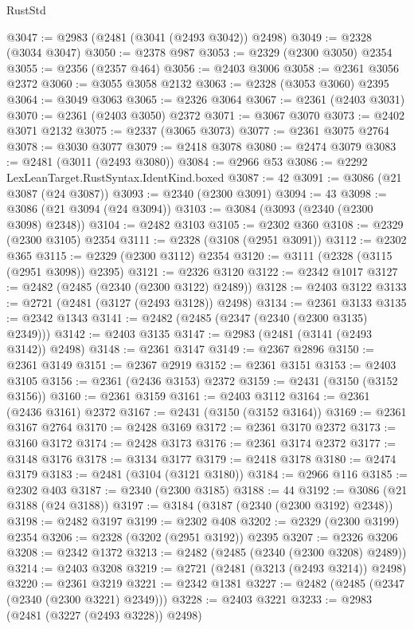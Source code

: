 \begin{lexlean}{RustStd}
\begin{coremodule}
{\begin{coremodule}
{{{{{{{{{{{{{{{{{{{{{{{{{{{{{{{{{{{{{@3047 := @2983 (@2481 (@3041 (@2493 @3042)) @2498)
@3049 := @2328 (@3034 @3047)
@3050 := @2378 @987
@3053 := @2329 (@2300 @3050) @2354
@3055 := @2356 (@2357 @464)
@3056 := @2403 @3006
@3058 := @2361 @3056 @2372
@3060 := @3055 @3058 @2132
@3063 := @2328 (@3053 @3060) @2395
@3064 := @3049 @3063
@3065 := @2326 @3064
@3067 := @2361 (@2403 @3031)
@3070 := @2361 (@2403 @3050) @2372
@3071 := @3067 @3070
@3073 := @2402 @3071 @2132
@3075 := @2337 (@3065 @3073)
@3077 := @2361 @3075 @2764
@3078 := @3030 @3077
@3079 := @2418 @3078
@3080 := @2474 @3079
@3083 := @2481 (@3011 (@2493 @3080))
@3084 := @2966 @53
@3086 := @2292 LexLeanTarget.RustSyntax.IdentKind.boxed
@3087 := 42
@3091 := @3086 (@21 @3087 (@24 @3087))
@3093 := @2340 (@2300 @3091)
@3094 := 43
@3098 := @3086 (@21 @3094 (@24 @3094))
@3103 := @3084 (@3093 (@2340 (@2300 @3098) @2348))
@3104 := @2482 @3103
@3105 := @2302 @360
@3108 := @2329 (@2300 @3105) @2354
@3111 := @2328 (@3108 (@2951 @3091))
@3112 := @2302 @365
@3115 := @2329 (@2300 @3112) @2354
@3120 := @3111 (@2328 (@3115 (@2951 @3098)) @2395)
@3121 := @2326 @3120
@3122 := @2342 @1017
@3127 := @2482 (@2485 (@2340 (@2300 @3122) @2489))
@3128 := @2403 @3122
@3133 := @2721 (@2481 (@3127 (@2493 @3128)) @2498)
@3134 := @2361 @3133
@3135 := @2342 @1343
@3141 := @2482 (@2485 (@2347 (@2340 (@2300 @3135) @2349)))
@3142 := @2403 @3135
@3147 := @2983 (@2481 (@3141 (@2493 @3142)) @2498)
@3148 := @2361 @3147
@3149 := @2367 @2896
@3150 := @2361 @3149
@3151 := @2367 @2919
@3152 := @2361 @3151
@3153 := @2403 @3105
@3156 := @2361 (@2436 @3153) @2372
@3159 := @2431 (@3150 (@3152 @3156))
@3160 := @2361 @3159
@3161 := @2403 @3112
@3164 := @2361 (@2436 @3161) @2372
@3167 := @2431 (@3150 (@3152 @3164))
@3169 := @2361 @3167 @2764
@3170 := @2428 @3169
@3172 := @2361 @3170 @2372
@3173 := @3160 @3172
@3174 := @2428 @3173
@3176 := @2361 @3174 @2372
@3177 := @3148 @3176
@3178 := @3134 @3177
@3179 := @2418 @3178
@3180 := @2474 @3179
@3183 := @2481 (@3104 (@3121 @3180))
@3184 := @2966 @116
@3185 := @2302 @403
@3187 := @2340 (@2300 @3185)
@3188 := 44
@3192 := @3086 (@21 @3188 (@24 @3188))
@3197 := @3184 (@3187 (@2340 (@2300 @3192) @2348))
@3198 := @2482 @3197
@3199 := @2302 @408
@3202 := @2329 (@2300 @3199) @2354
@3206 := @2328 (@3202 (@2951 @3192)) @2395
@3207 := @2326 @3206
@3208 := @2342 @1372
@3213 := @2482 (@2485 (@2340 (@2300 @3208) @2489))
@3214 := @2403 @3208
@3219 := @2721 (@2481 (@3213 (@2493 @3214)) @2498)
@3220 := @2361 @3219
@3221 := @2342 @1381
@3227 := @2482 (@2485 (@2347 (@2340 (@2300 @3221) @2349)))
@3228 := @2403 @3221
@3233 := @2983 (@2481 (@3227 (@2493 @3228)) @2498)
}}}}}}}}}}}}}}}}}}}}}}}}}}}}}}}}}}}}}
\end{coremodule}}
\end{coremodule}
\end{lexlean}
